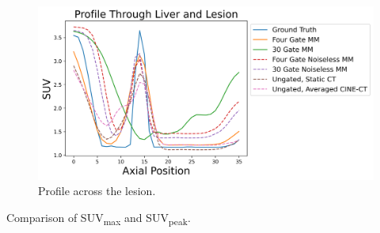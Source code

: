 \documentclass[portrait, color=UCLburgundy, margin=1cm]{uclposter}
\begin{document}
\begin{multicols}{2}
\begin{figure}[H]
            \includegraphics[width=1.0\linewidth]{profile.png}
            
            \begin{highlightbox}[UCLlightblue]
                \captionsetup{singlelinecheck=false, justification=centering}
                \caption{Profile across the lesion.}
            \end{highlightbox}
            
            \label{fig:profile}
        \end{figure}
        
        \begin{table}[H]
            \centering
            
            \begin{highlightbox}[UCLlightblue]
                \captionsetup{singlelinecheck=false, justification=centering}
                \caption{Comparison of \acrshort{SUV}\textsubscript{max} and \acrshort{SUV}\textsubscript{peak}.}
            \end{highlightbox}
            
            \vspace{1.0cm}
            

\end{table}
\end{multicols}
\end{document}
